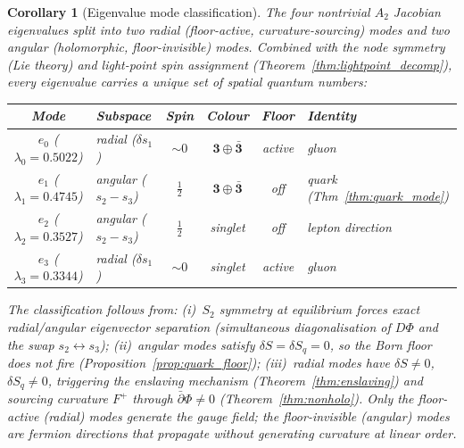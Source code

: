 \documentclass[11pt,a4paper]{article}
\let\hline\midrule
\newtheorem{corollary}[theorem]{Corollary}
\theoremstyle{definition}
\theoremstyle{remark}
\newcommand{\dbar}{\bar{\partial}}
\begin{document}
\begin{corollary}[Eigenvalue mode classification]\label{cor:mode_classification}
The four nontrivial $A_2$ Jacobian eigenvalues split into two radial (floor-active, curvature-sourcing) modes and two angular (holomorphic, floor-invisible) modes. Combined with the node symmetry (Lie theory) and light-point spin assignment (Theorem~\ref{thm:lightpoint_decomp}), every eigenvalue carries a unique set of spatial quantum numbers:

\begin{center}
\begin{tabular}{clcccl}
\hline
Mode & Subspace & Spin & Colour & Floor & Identity \\
\hline
$e_0$ ($\lambda_0=0.5022$) & radial ($\delta s_1$) & $\sim\!0$ & $\mathbf{3}\oplus\bar{\mathbf{3}}$ & active & gluon \\
$e_1$ ($\lambda_1=0.4745$) & angular ($s_2\!-\!s_3$) & $\tfrac{1}{2}$ & $\mathbf{3}\oplus\bar{\mathbf{3}}$ & off & quark (Thm~\ref{thm:quark_mode}) \\
$e_2$ ($\lambda_2=0.3527$) & angular ($s_2\!-\!s_3$) & $\tfrac{1}{2}$ & singlet & off & lepton direction \\
$e_3$ ($\lambda_3=0.3344$) & radial ($\delta s_1$) & $\sim\!0$ & singlet & active & gluon \\
\hline
\end{tabular}
\end{center}
The classification follows from: (i)~$S_2$ symmetry at equilibrium forces exact radial/angular eigenvector separation (simultaneous diagonalisation of $D\Phi$ and the swap $s_2\leftrightarrow s_3$); (ii)~angular modes satisfy $\delta S=\delta S_q=0$, so the Born floor does not fire (Proposition~\ref{prop:quark_floor}); (iii)~radial modes have $\delta S\neq 0$, $\delta S_q\neq 0$, triggering the enslaving mechanism (Theorem~\ref{thm:enslaving}) and sourcing curvature $F^+$ through $\dbar\Phi\neq 0$ (Theorem~\ref{thm:nonholo}). Only the floor-active (radial) modes generate the gauge field; the floor-invisible (angular) modes are fermion directions that propagate without generating curvature at linear order.
\end{corollary}
\end{document}
